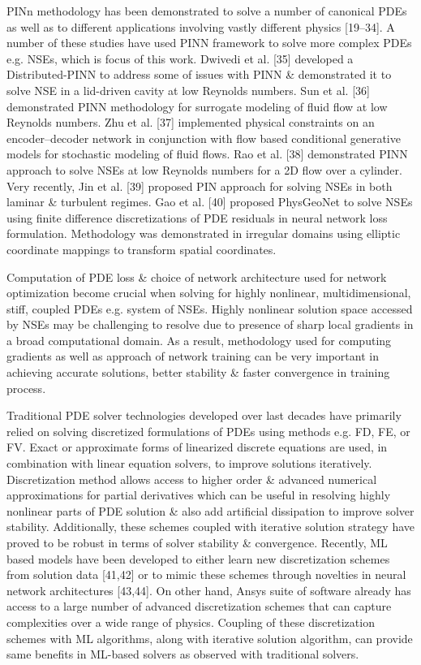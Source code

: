 \documentclass{article}
\begin{document}
\begin{itemize}
	PINn methodology has been demonstrated to solve a number of canonical PDEs as well as to different applications involving vastly different physics [19--34]. A number of these studies have used PINN framework to solve more complex PDEs e.g. NSEs, which is focus of this work. Dwivedi et al. [35] developed a Distributed-PINN to address some of issues with PINN \& demonstrated it to solve NSE in a lid-driven cavity at low Reynolds numbers. Sun et al. [36] demonstrated PINN methodology for surrogate modeling of fluid flow at low Reynolds numbers. Zhu et al. [37] implemented physical constraints on an encoder--decoder network in conjunction with flow based conditional generative models for stochastic modeling of fluid flows. Rao et al. [38] demonstrated PINN approach to solve NSEs at low Reynolds numbers for a 2D flow over a cylinder. Very recently, Jin et al. [39] proposed PIN approach for solving NSEs in both laminar \& turbulent regimes. Gao et al. [40] proposed PhysGeoNet to solve NSEs using finite difference discretizations of PDE residuals in neural network loss formulation. Methodology was demonstrated in irregular domains using elliptic coordinate mappings to transform spatial coordinates.
	
	Computation of PDE loss \& choice of network architecture used for network optimization become crucial when solving for highly nonlinear, multidimensional, stiff, coupled PDEs e.g. system of NSEs. Highly nonlinear solution space accessed by NSEs may be challenging to resolve due to presence of sharp local gradients in a broad computational domain. As a result, methodology used for computing gradients as well as approach of network training can be very important in achieving accurate solutions, better stability \& faster convergence in training process.
	
	Traditional PDE solver technologies developed over last decades have primarily relied on solving discretized formulations of PDEs using methods e.g. FD, FE, or FV. Exact or approximate forms of linearized discrete equations are used, in combination with linear equation solvers, to improve solutions iteratively. Discretization method allows access to higher order \& advanced numerical approximations for partial derivatives which can be useful in resolving highly nonlinear parts of PDE solution \& also add artificial dissipation to improve solver stability. Additionally, these schemes coupled with iterative solution strategy have proved to be robust in terms of solver stability \& convergence. Recently, ML based models have been developed to either learn new discretization schemes from solution data [41,42] or to mimic these schemes through novelties in neural network architectures [43,44]. On other hand, Ansys suite of software already has access to a large number of advanced discretization schemes that can capture complexities over a wide range of physics. Coupling of these discretization schemes with ML algorithms, along with iterative solution algorithm, can provide same benefits in ML-based solvers as observed with traditional solvers.
	

\end{itemize}
\end{document}
